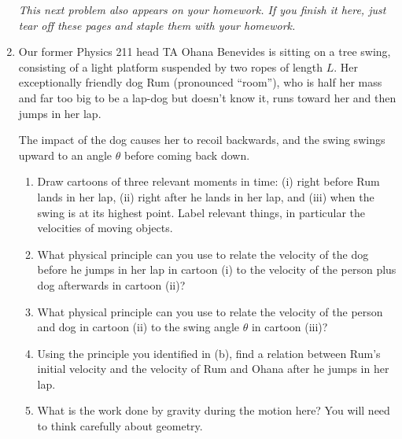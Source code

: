 \documentclass[12pt]{article}
\begin{document}
\begin{enumerate}
\it This next problem also appears on your homework. If you finish it here, just tear off these pages and staple them with your homework.

\rm

\item Our former Physics 211 head TA Ohana Benevides is sitting on a tree swing, consisting of a light platform suspended by two ropes of length $L$. Her exceptionally friendly dog Rum (pronounced ``room''), who is half her mass and far too big to be a lap-dog but doesn't know it, runs toward her and then jumps in her lap.

The impact of the dog causes her to recoil backwards, and the swing swings upward to an angle $\theta$ before coming back down.

\begin{enumerate}

\item Draw cartoons of three relevant moments in time: (i) right before Rum lands in her lap, (ii) right after he lands in her lap, and (iii) when the swing is at its highest point. Label relevant things, in particular the velocities
of moving objects.

\vspace{3.5in}

\item What physical principle can you use to relate the velocity of the dog before he jumps in her lap in cartoon (i) to the velocity of the person plus dog afterwards in cartoon (ii)?

\vspace{1in}

\item What physical principle can you use to relate the velocity of the person and dog in cartoon (ii) to the swing angle $\theta$ in cartoon (iii)?

\vspace{1in}
\newpage

\item Using the principle you identified in (b), find a relation between Rum's initial velocity and the velocity of Rum and Ohana after he jumps in her lap.

\vspace{2in}

\item What is the work done by gravity during the motion here? You will need to think carefully about geometry.

\vspace{3in}


\end{enumerate}
\end{enumerate}
\end{document}
